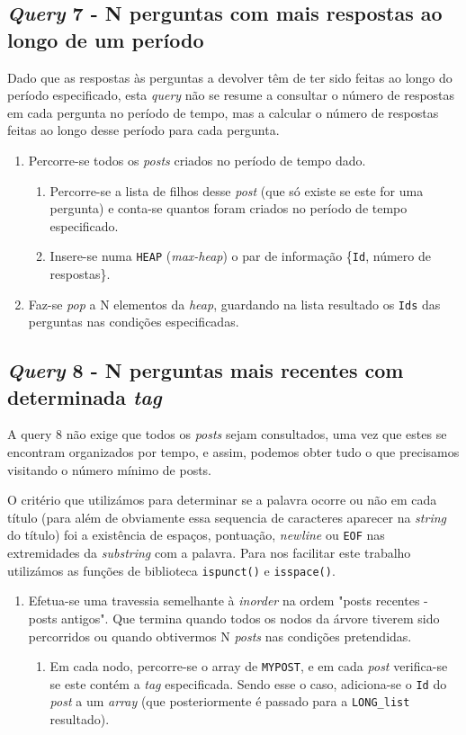 \documentclass[10pt]{article}
\begin{document}
	\subsection*{\textit{Query} 7 - N perguntas com mais respostas ao longo de um período}
			Dado que as respostas às perguntas a devolver têm de ter sido feitas ao longo
		do período especificado, esta \textit{query} não se resume a consultar o número
		de respostas em cada pergunta no período de tempo, mas a calcular o número de 
		respostas feitas ao longo desse período para cada pergunta.
			\begin{enumerate}
				\item Percorre-se todos os \textit{posts} criados no período de tempo
					dado.
					\begin{enumerate}
						\item Percorre-se a lista de filhos desse \textit{post} (que só
							existe se este for uma pergunta) e conta-se quantos foram
							criados no período de tempo especificado.
						\item Insere-se numa \texttt{HEAP} (\textit{max-heap}) o par de  
							informação \{\texttt{Id}, número de respostas\}.
					\end{enumerate}
				\item Faz-se \textit{pop} a N elementos da \textit{heap}, guardando 
					na lista resultado os \texttt{Ids} das perguntas nas condições
					especificadas.
			\end{enumerate}
	\subsection*{\textit{Query} 8 - N perguntas mais recentes com determinada \textit{tag}}
			A query 8 não exige que todos os \textit{posts} sejam consultados,
		uma vez que estes se encontram organizados por tempo, e assim, podemos obter tudo o que 				precisamos visitando o número	mínimo de posts.
		
			O critério que utilizámos para determinar se a palavra ocorre ou não em cada
		título (para além de obviamente essa sequencia de caracteres aparecer na \textit{string}
		do título) foi a existência de espaços, pontuação, \textit{newline} ou \texttt{EOF}
		nas extremidades da \textit{substring} com a palavra. Para nos facilitar este trabalho
		utilizámos as funções de biblioteca \texttt{ispunct()} e \texttt{isspace()}.
			\begin{enumerate}
				\item Efetua-se uma travessia semelhante à \textit{inorder} na ordem
					"posts recentes - posts antigos". Que termina quando todos os
					nodos da árvore tiverem sido percorridos ou quando obtivermos N
					\textit{posts} nas condições pretendidas.
					\begin{enumerate}
						\item	Em cada nodo, percorre-se o array de \texttt{MYPOST}, e em cada 
						\textit{post} verifica-se se este contém a \textit{tag} especificada.
						Sendo esse o caso, adiciona-se o \texttt{Id} do \textit{post} a um
						\textit{array} (que posteriormente é passado para a \texttt{LONG\_list} 
						resultado).
					\end{enumerate}
			\end{enumerate}
\end{document}
